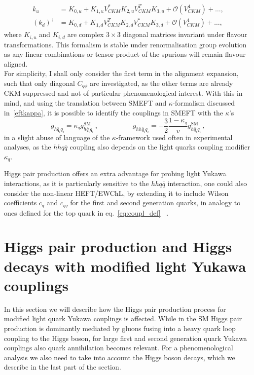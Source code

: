  \begin{align}
 	k_u &= K_{0,u}+ K_{1,u} V^*_{CKM} K_{2,u} V^T_{CKM} K_{3,u} + \mathcal O(V^4_{CKM})+ \dots,  \\
 	(k_d)^\dagger&=K_{0,d}+ K_{1,d} V^T_{CKM} K_{2,d} V^*_{CKM} K_{3,d} + \mathcal O(V^4_{CKM}) + \dots,
 	\label{eqK}
 \end{align}
 where $K_{i,u}$ and $K_{i,d}$ are complex $3\times3$ diagonal matrices invariant under flavour transformations. This formalism is stable under renormalisation group evolution as any linear combinations or tensor product of the spurions will remain flavour aligned. \\
 For simplicity, I shall only consider the first term in the alignment expansion, such that only diagonal $C_{q\phi}$ are investigated, as the other terms are already CKM-suppressed and not of particular phenomenological interest.  With this in mind, and using the translation between SMEFT and $\kappa$-formalism discussed in~\autoref{eftkappa}, it is possible to identify the couplings in SMEFT with the $\kappa$'s
\begin{equation}
	g_{h\bar{q}_i q_i} =\kappa_q g_{h\bar{q}_i q_i}^{\text{SM}} \,, \quad \quad \quad \quad \quad g_{h h\bar{q}_i q_i}= - \frac{3}{2}\frac{1-\kappa_q}{v}g_{h\bar{q}_i q_i}^{\text{SM}} \,,
	\label{eq:def_kappa}
\end{equation}
in a slight abuse of language of the $\kappa$-framework used often in experimental analyses, as the $hhq \bar q$ coupling also depends on the light quarks coupling modifier $\kappa_q$. 
\par
Higgs pair production offers an extra advantage for probing light Yukawa interactions, as it is particularly sensitive to the $hh q\bar q$ interaction, one could also consider the non-linear HEFT/EWChL, by extending it to include Wilson coefficients $c_q$ and $c_{qq}$ for the first and second generation quarks, in analogy to ones defined for the top quark in eq.~\eqref{eq:coupl_def}~ \cite{Contino:2010mh}.
\section{Higgs pair production and Higgs decays with modified light Yukawa couplings \label{sec:qqHH}}
In this section we will describe how the Higgs pair production process for modified light quark Yukawa couplings is affected.
While in the SM Higgs pair production is dominantly mediated by gluons fusing into a heavy quark loop coupling to the Higgs boson, for large first and second generation quark Yukawa couplings
also quark annihilation becomes relevant.
For a phenomenological analysis we also need to take into account the Higgs boson decays, which we describe in the last part of the section.
